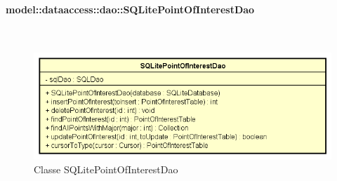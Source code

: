 \documentclass[../DefinizioneDiProdotto.tex]{subfiles}
\begin{document}
\paragraph{model::dataaccess::dao::SQLitePointOfInterestDao}
\
\begin{figure}[H]
	\centering
	\includegraphics[width=\maxwidth]{img/SQLitePointOfInterestDao.png}
	\caption{Classe SQLitePointOfInterestDao}\label{fig:model::dataaccess::dao::SQLitePointOfInterestDao} 
\end{figure}
\end{document}
